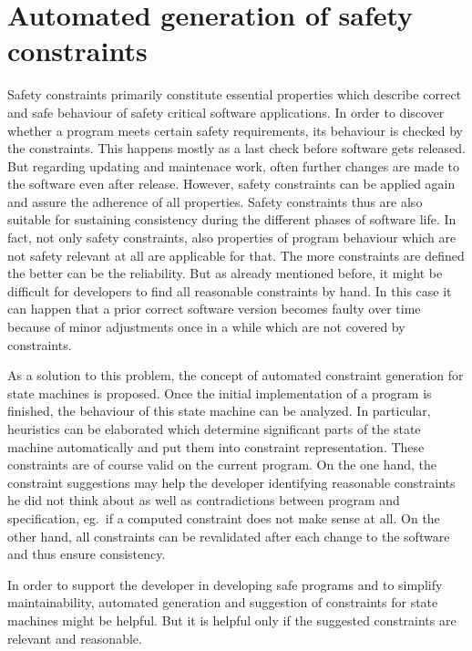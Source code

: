 \chapter{Automated generation of safety constraints}
\label{chap:automatedgenerationofsafetyconstraints}

Safety constraints primarily constitute essential properties which describe correct and safe behaviour of safety critical software applications. In order to discover whether a program meets certain safety requirements, its behaviour is checked by the constraints. This happens mostly as a last check before software gets released. 
But regarding updating and maintenace work, often further changes are made to the software even after release.
However, safety constraints can be applied again and assure the adherence of all properties. Safety constraints thus are also suitable for sustaining consistency during the different phases of software life. In fact, not only safety constraints, also properties of program behaviour which are not safety relevant at all are applicable for that. The more constraints are defined the better can be the reliability.
But as already mentioned before, it might be difficult for developers to find all reasonable %
constraints by hand. %
In this case it can happen that a prior correct software version becomes faulty over time because of minor adjustments once in a while which are not covered by constraints.

As a solution to this problem, the concept of automated constraint generation for state machines is proposed. Once the initial implementation of a program is finished, the behaviour of this state machine can be analyzed. In particular, heuristics can be elaborated which determine significant parts of the state machine automatically and put them into constraint representation. These constraints are of course valid on the current program.
On the one hand, the constraint suggestions may help the developer identifying reasonable constraints he did not think about as well as contradictions between program and specification, eg.\ if a computed constraint does not make sense at all.
On the other hand, all constraints can be revalidated after each change to the software and thus ensure consistency.

In order to support the developer in developing safe programs and to simplify maintainability, automated generation and suggestion of constraints for state machines might be helpful. But it is helpful only if the suggested constraints are relevant and reasonable.


